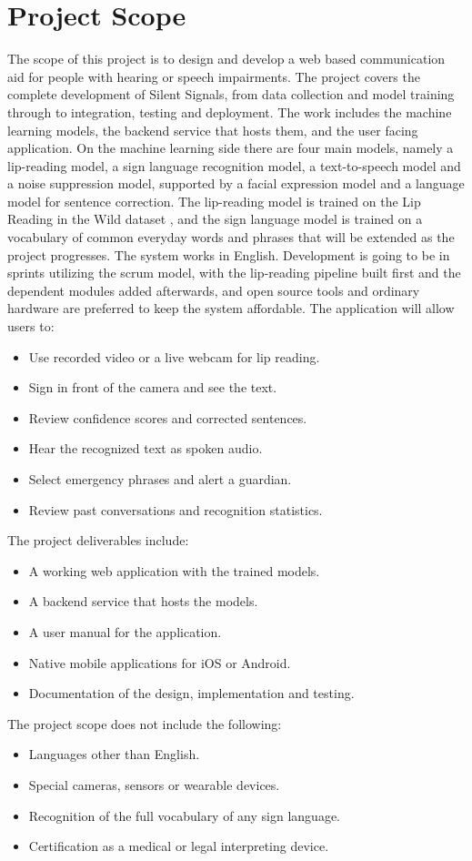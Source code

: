 \documentclass{FastFyp}
\begin{document}
\section{Project Scope}
The scope of this project is to design and develop a web based communication aid for people with hearing or speech impairments. The project covers the complete development of Silent Signals, from data collection and model training through to integration, testing and deployment. The work includes the machine learning models, the backend service that hosts them, and the user facing application. On the machine learning side there are four main models, namely a lip-reading model, a sign language recognition model, a text-to-speech model and a noise suppression model, supported by a facial expression model and a language model for sentence correction. The lip-reading model is trained on the Lip Reading in the Wild dataset \cite{ref:Chung:2016}, and the sign language model is trained on a vocabulary of common everyday words and phrases that will be extended as the project progresses. The system works in English. Development is going to be in sprints utilizing the scrum model, with the lip-reading pipeline built first and the dependent modules added afterwards, and open source tools and ordinary hardware are preferred to keep the system affordable. The application will allow users to:
\begin{itemize}
  \item Use recorded video or a live webcam for lip reading.
  \item Sign in front of the camera and see the text.
  \item Review confidence scores and corrected sentences.
  \item Hear the recognized text as spoken audio.
  \item Select emergency phrases and alert a guardian.
  \item Review past conversations and recognition statistics.
\end{itemize}
The project deliverables include:
\begin{itemize}
  \item A working web application with the trained models.
  \item A backend service that hosts the models.
  \item A user manual for the application.
  \item Native mobile applications for iOS or Android.
  \item Documentation of the design, implementation and testing.
\end{itemize}
The project scope does not include the following:
\begin{itemize}
  \item Languages other than English.
  \item Special cameras, sensors or wearable devices.
  \item Recognition of the full vocabulary of any sign language.
  \item Certification as a medical or legal interpreting device.
\end{itemize}
\end{document}

